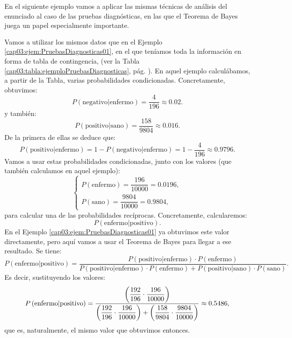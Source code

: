 En el siguiente ejemplo vamos a aplicar las mismas técnicas de análisis del enunciado al caso de las pruebas diagnósticas, en las que el Teorema de Bayes juega un papel especialmente importante.
\begin{ejemplo}
\label{cap03:ejem:PruebasDiagnosticasBayes}
    Vamos a utilizar los mismos datos que en el Ejemplo \ref{cap03:ejem:PruebasDiagnosticas01}, en el que teníamos toda la información en forma de tabla de contingencia, (ver la Tabla \ref{cap03:tabla:ejemploPruebasDiagnosticas}, pág. \pageref{cap03:tabla:ejemploPruebasDiagnosticas}). En aquel ejemplo calculábamos, a partir de la Tabla, varias probabilidades condicionadas. Concretamente, obtuvimos:
    \[P\left(\mbox{negativo} | \mbox{enfermo} \right)=\dfrac{4}{196}\approx 0.02.\]
    y también:
    \[P\left(\mbox{positivo} | \mbox{sano} \right)=\dfrac{158}{9804}\approx 0.016.\]
    De la primera de ellas se deduce que:
    \[P\left(\mbox{positivo} | \mbox{enfermo} \right)=
    1-P\left(\mbox{negativo} | \mbox{enfermo} \right)=
    1-\dfrac{4}{196}\approx 0.9796.\]
    Vamos a usar estas probabilidades condicionadas, junto con los valores (que también calculamos en aquel ejemplo):
    \[
    \begin{cases}
    P(\mbox{enfermo})=\dfrac{196}{10000}=0.0196,\\[3mm]
    P(\mbox{sano})=\dfrac{9804}{10000}=0.9804,
    \end{cases}
    \]
    para calcular una de las probabilidades recíprocas. Concretamente, calcularemos:
    \[P\left(\mbox{enfermo} | \mbox{positivo}\right).\]
    En el Ejemplo \ref{cap03:ejem:PruebasDiagnosticas01} ya obtuvimos este valor directamente, pero aquí vamos a usar el Teorema de Bayes para llegar a ese resultado. Se tiene:
    {\small
    \[P\left(\mbox{enfermo} | \mbox{positivo}\right)=
    \dfrac{P\left(\mbox{positivo} | \mbox{enfermo}\right)\cdot P(\mbox{enfermo})}
    {P\left(\mbox{positivo} | \mbox{enfermo}\right)\cdot P(\mbox{enfermo})+
    P\left(\mbox{positivo} | \mbox{sano}\right)\cdot P(\mbox{sano})}.
    \]
    }
    Es decir, sustituyendo los valores:
    \[P\left(\mbox{enfermo} | \mbox{positivo}\right)={\small
    \dfrac{\left(\dfrac{192}{196}\cdot\dfrac{196}{10000}\right)}{
    \left(\dfrac{192}{196}\cdot\dfrac{196}{10000}\right)+
    \left(\dfrac{158}{9804}\cdot\dfrac{9804}{10000}\right)
    }}\approx 0.5486,
    \]
    que es, naturalmente, el mismo valor que obtuvimos entonces.
%

\end{ejemplo}
